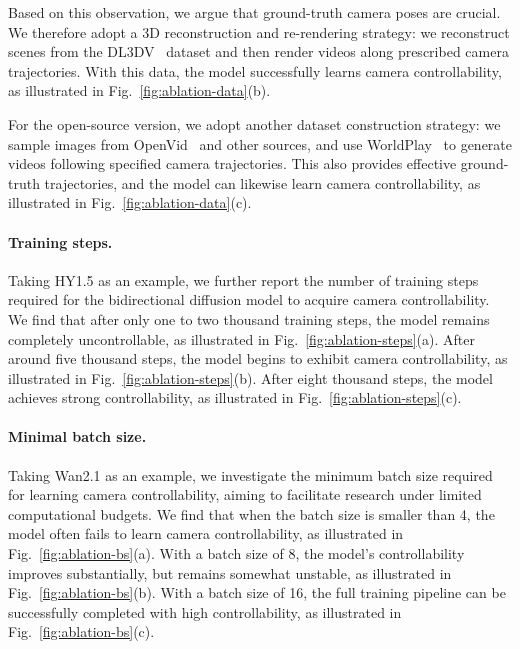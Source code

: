\documentclass{llmxive}
\begin{document}
Based on this observation, we argue that ground-truth camera poses are crucial. We therefore adopt a 3D reconstruction and re-rendering strategy: we reconstruct scenes from the DL3DV~\cite{ling2024dl3dv} dataset and then render videos along prescribed camera trajectories. With this data, the model successfully learns camera controllability, as illustrated in Fig.~\ref{fig:ablation-data}(b).

For the open-source version, we adopt another dataset construction strategy: we sample images from OpenVid~\cite{nan2024openvid} and other sources, and use WorldPlay~\cite{sun2025worldplay} to generate videos following specified camera trajectories. This also provides effective ground-truth trajectories, and the model can likewise learn camera controllability, as illustrated in Fig.~\ref{fig:ablation-data}(c).


\paragraph{Training steps.} 

Taking HY1.5 as an example, we further report the number of training steps required for the bidirectional diffusion model to acquire camera controllability. We find that after only one to two thousand training steps, the model remains completely uncontrollable, as illustrated in Fig.~\ref{fig:ablation-steps}(a). After around five thousand steps, the model begins to exhibit camera controllability, as illustrated in Fig.~\ref{fig:ablation-steps}(b). After eight thousand steps, the model achieves strong controllability, as illustrated in Fig.~\ref{fig:ablation-steps}(c).

\paragraph{Minimal batch size.}

Taking Wan2.1 as an example, we investigate the minimum batch size required for learning camera controllability, aiming to facilitate research under limited computational budgets. We find that when the batch size is smaller than 4, the model often fails to learn camera controllability, as illustrated in Fig.~\ref{fig:ablation-bs}(a). With a batch size of 8, the model's controllability improves substantially, but remains somewhat unstable, as illustrated in Fig.~\ref{fig:ablation-bs}(b). With a batch size of 16, the full training pipeline can be successfully completed with high controllability, as illustrated in Fig.~\ref{fig:ablation-bs}(c).
\end{document}
